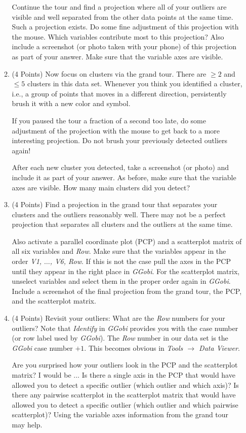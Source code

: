 \documentclass[12pt,letterpaper,final]{article}
\begin{document}
\begin{enumerate}
\begin{enumerate}
Continue the tour and find a projection where
all of your outliers are visible and well separated from the
other data points at the same time. Such a projection exists.
Do some fine adjustment of this projection with the mouse. Which 
variables contribute most to this projection? Also include a screenshot
(or photo taken with your phone) of this projection
as part of your answer. Make sure that the variable axes are visible. 


\item (4 Points)
Now focus on clusters via the grand tour. There are $\geq 2$ and $\leq 5$
clusters in this data set. Whenever you think you identified a cluster,
i.e., a group of points that moves in a different direction, persistently
brush it with a new color and symbol. 

If you paused the tour a fraction of a second too late, do some adjustment
of the projection with the mouse to get back to a more interesting projection.
Do not brush your previously detected
outliers again! 

After each new cluster you detected, take a screenshot (or photo)
and include it as part of your answer. As before, make sure that the 
variable axes are visible. How many main clusters did you detect? 


\item (4 Points)
Find a projection in the grand tour that separates your clusters and
the outliers reasonably well. There may not be a perfect projection
that separates all clusters and the outliers at the same time.

Also activate a parallel coordinate plot (PCP) and a scatterplot matrix of all
six variables and {\it Row}. Make sure that the variables
appear in the order {\it V1, $\ldots$, V6, Row}. If this is not the case
pull the axes in the PCP until they appear in the right place in {\it GGobi}.
For the scatterplot matrix, unselect variables and select them in the
proper order again in {\it GGobi}. Include a screenshot of the final projection
from the grand tour, the PCP, and the scatterplot matrix. 


\item (4 Points)
Revisit your outliers: What are the {\it Row} numbers for your outliers?
Note that {\it Identify} in {\it GGobi} provides you with the case number 
(or row label used by {\it GGobi}).
The {\it Row} number in our data set is the {\it GGobi} case number $+ 1$.
This becomes obvious in {\it Tools $\rightarrow$ Data Viewer}. 

Are you surprised how your outliers look in the PCP and the scatterplot matrix?
I would be $\ldots$ Is there a single axis in the PCP that would have
allowed you to detect a specific outlier (which outlier and which axis)? 
Is there any pairwise scatterplot in the scatterplot matrix that would have
allowed you to detect a specific outlier (which outlier and which pairwise scatterplot)? 
Using the variable axes information from the grand tour may help.


\end{enumerate}
\end{enumerate}
\end{document}
